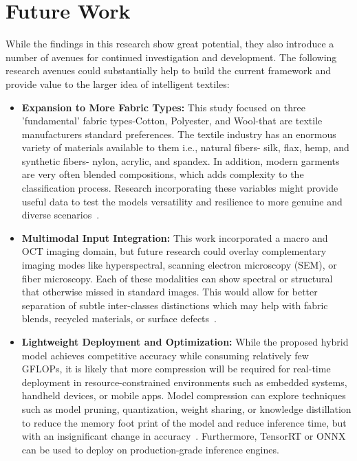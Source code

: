 \section{Future Work}

While the findings in this research show great potential, they also introduce a number of avenues for continued investigation and development. The following research avenues could substantially help to build the current framework and provide value to the larger idea of intelligent textiles: 

\begin{itemize}
    \item \textbf{Expansion to More Fabric Types:} This study focused on three 'fundamental' fabric types-Cotton, Polyester, and Wool-that are textile manufacturers standard preferences. The textile industry has an enormous variety of materials available to them i.e., natural fibers- silk, flax, hemp, and synthetic fibers- nylon, acrylic, and spandex. In addition, modern garments are very often blended compositions, which adds complexity to the classification process. Research incorporating these variables might provide useful data to test the models versatility and resilience to more genuine and diverse scenarios~\cite{kampouris2016fine}.
    
    \item \textbf{Multimodal Input Integration:} This work incorporated a macro and OCT imaging domain, but future research could overlay complementary imaging modes like hyperspectral, scanning electron microscopy (SEM), or fiber microscopy. Each of these modalities can show spectral or structural that otherwise missed in standard images. This would allow for better separation of subtle inter-classes distinctions which may help with fabric blends, recycled materials, or surface defects~\cite{sabuncu2022optical}.
    
    \item \textbf{Lightweight Deployment and Optimization:} While the proposed hybrid model achieves competitive accuracy while consuming relatively few GFLOPs, it is likely that more compression will be required for real-time deployment in resource-constrained environments such as embedded systems, handheld devices, or mobile apps. Model compression can explore techniques such as model pruning, quantization, weight sharing, or knowledge distillation to reduce the memory foot print of the model and reduce inference time, but with an insignificant change in accuracy~\cite{touvron2021training}. Furthermore, TensorRT or ONNX can be used to deploy on production-grade inference engines. 


\end{itemize}
